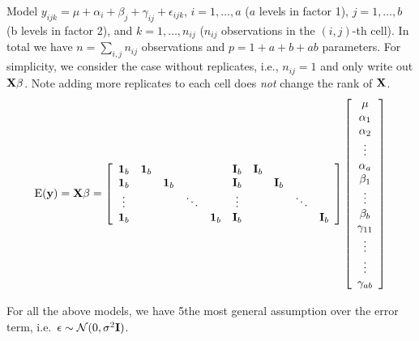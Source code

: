 Model $y_{ijk} = \mu + \alpha_i + \beta_j + \gamma_{ij} + \epsilon_{ijk}$, $i = 1, \dots, a$ ($a$ levels in factor 1), $j = 1, \dots, b$ (b levels in factor 2), and $k = 1, \dots, n_{ij}$ ($n_{ij}$ observations in the $(i,j)$-th cell).
In total we have $n = \sum_{i,j} n_{ij}$ observations and $p = 1 + a + b+ ab$ parameters.
For simplicity, we consider the case without replicates, i.e., $n_{ij}= 1$ and only write out $\mathbf{X\beta}$.
Note adding more replicates to each cell does {\it not} change the rank of $\mathbf{X}$.
$$
\mbox{E}(\mathbf{y}) = \mathbf{X\beta} = \left[ \begin{array}{cccccccccc} \mathbf{1}_b   & \mathbf{1}_b &  & & & \mathbf{I}_b  & \mathbf{I}_b & & &\\ \mathbf{1}_b &  & \mathbf{1}_b & & & \mathbf{I}_b & & \mathbf{I}_b & &\\ \vdots &  & & \ddots & & \vdots & & & \ddots & \\ \mathbf{1}_b & &  &  & \mathbf{1}_b & \mathbf{I}_b & & & &\mathbf{I}_b\\ \end{array} \right] \left[ \begin{array}{c} \mu\\ \alpha_1 \\ \alpha_2\\ \vdots \\ \alpha_a \\ \beta_1 \\ \vdots\\ \beta_b \\ \gamma_{11}\\ \vdots \\ \vdots\\ \gamma_{ab} \end{array} \right] 
$$

For all the above models, we have 5the most general assumption over the error term, i.e.~$\mathbf{\epsilon}\sim \mathcal{N}(0, \sigma^2\mathbf{I})$.

